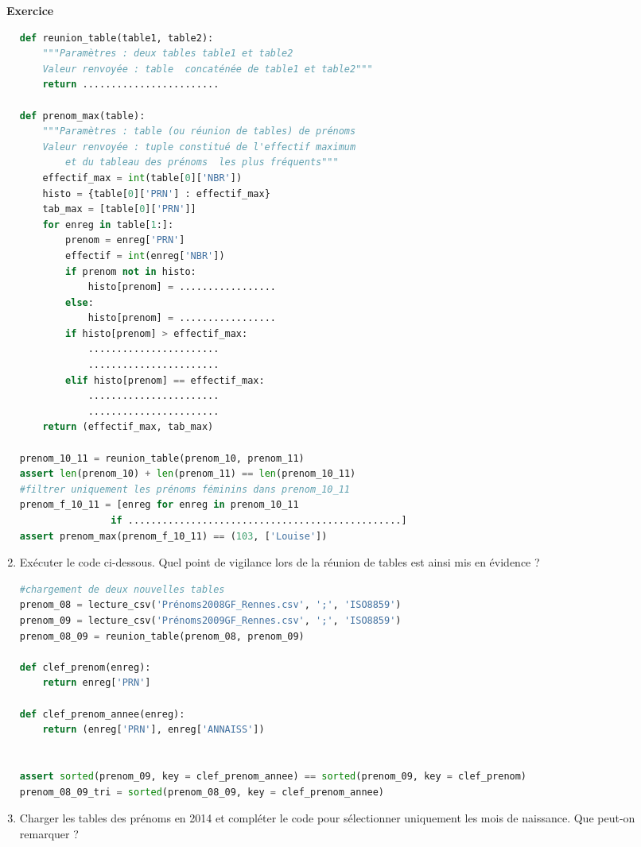 \documentclass[
  11pt,
]{article}
\newcounter{exo}
\newenvironment{exercice}[1]
{\par \medskip   \addtocounter{exo}{1} \noindent  
\begin{bclogo}[arrondi =0.1,   noborder = true, logo=\bccrayon, marge=4]{~\textbf{Exercice} \textbf{\theexo} {\itshape #1} }  \par}
{
\end{bclogo}
 \par \bigskip }
\newcounter{rque}
\newcounter{def}
\newcounter{histo}
\begin{document}
\begin{exercice}{}
\begin{enumerate}
\begin{lstlisting}[language=Python]
def reunion_table(table1, table2):
    """Paramètres : deux tables table1 et table2
    Valeur renvoyée : table  concaténée de table1 et table2"""
    return ........................

def prenom_max(table):
    """Paramètres : table (ou réunion de tables) de prénoms 
    Valeur renvoyée : tuple constitué de l'effectif maximum
        et du tableau des prénoms  les plus fréquents"""
    effectif_max = int(table[0]['NBR'])
    histo = {table[0]['PRN'] : effectif_max}   
    tab_max = [table[0]['PRN']]
    for enreg in table[1:]:
        prenom = enreg['PRN']
        effectif = int(enreg['NBR'])
        if prenom not in histo:
            histo[prenom] = .................
        else:
            histo[prenom] = .................
        if histo[prenom] > effectif_max:
            .......................
            .......................
        elif histo[prenom] == effectif_max:
            .......................
            .......................
    return (effectif_max, tab_max)      

prenom_10_11 = reunion_table(prenom_10, prenom_11)
assert len(prenom_10) + len(prenom_11) == len(prenom_10_11)
#filtrer uniquement les prénoms féminins dans prenom_10_11
prenom_f_10_11 = [enreg for enreg in prenom_10_11 
                if ................................................]
assert prenom_max(prenom_f_10_11) == (103, ['Louise'])
\end{lstlisting}
\item
  Exécuter le code ci-dessous. Quel point de vigilance lors de la
  réunion de tables est ainsi mis en évidence ?

\begin{lstlisting}[language=Python]
#chargement de deux nouvelles tables
prenom_08 = lecture_csv('Prénoms2008GF_Rennes.csv', ';', 'ISO8859')
prenom_09 = lecture_csv('Prénoms2009GF_Rennes.csv', ';', 'ISO8859')
prenom_08_09 = reunion_table(prenom_08, prenom_09)

def clef_prenom(enreg):
    return enreg['PRN']

def clef_prenom_annee(enreg):
    return (enreg['PRN'], enreg['ANNAISS'])


assert sorted(prenom_09, key = clef_prenom_annee) == sorted(prenom_09, key = clef_prenom)
prenom_08_09_tri = sorted(prenom_08_09, key = clef_prenom_annee) 
\end{lstlisting}
\item
  Charger les tables des prénoms en 2014 et compléter le code pour
  sélectionner uniquement les mois de naissance. Que peut-on remarquer ?


\end{enumerate}
\end{exercice}
\end{document}
